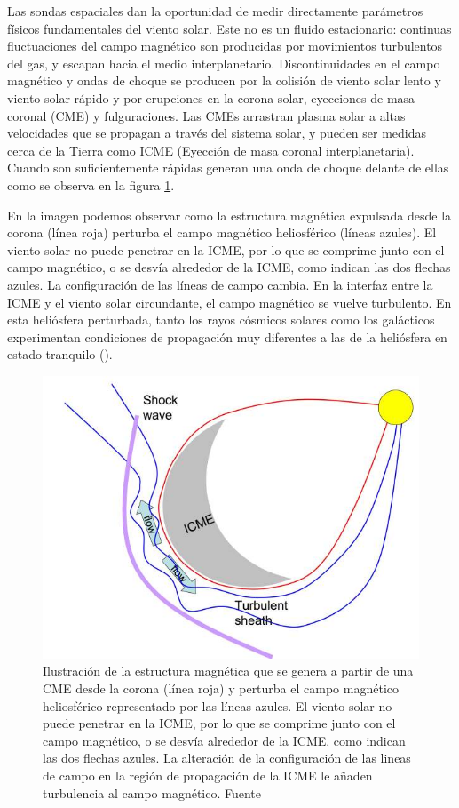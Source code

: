 Las sondas espaciales dan la oportunidad de medir directamente parámetros físicos fundamentales del viento solar. Este no es un fluido estacionario: continuas fluctuaciones del campo magnético son producidas por movimientos turbulentos del gas, y escapan hacia el medio interplanetario. Discontinuidades en el campo magnético y ondas de choque se producen por la colisión de viento solar lento y viento solar rápido y por erupciones en la corona solar, eyecciones de masa coronal (CME) y fulguraciones. Las CMEs arrastran plasma solar a altas velocidades que se propagan a través del sistema solar, y pueden ser medidas cerca de la Tierra como ICME (Eyección de masa coronal interplanetaria). Cuando son suficientemente rápidas generan una onda de choque delante de ellas como se observa en la figura \ref{icme}. 

En la imagen podemos observar como la estructura magnética expulsada desde la corona (línea roja) perturba el campo magnético heliosférico (líneas azules). El viento solar no puede penetrar en la ICME, por lo que se comprime junto con el campo magnético, o se desvía alrededor de la ICME, como indican las dos flechas azules. La configuración de las líneas de campo cambia. En la interfaz entre la ICME y el viento solar circundante, el campo magnético se vuelve turbulento. En esta heliósfera perturbada, tanto los rayos cósmicos solares como los galácticos experimentan condiciones de propagación muy diferentes a las de la heliósfera en estado tranquilo (\cite{NMDB}).
\begin{figure}[H]
    \centering
    \includegraphics[width=0.5\linewidth]{Figs/Dessin_ICME_sm_0.jpg}
    \caption{Ilustración de la estructura magnética que se genera a partir de una CME desde la corona (línea roja) y perturba el campo magnético heliosférico representado por las líneas azules. El viento solar no puede penetrar en la ICME, por lo que se comprime junto con el campo magnético, o se desvía alrededor de la ICME, como indican las dos flechas azules. La alteración de la configuración de las lineas de campo en la región de propagación de la ICME le añaden turbulencia al campo magnético. Fuente \cite{NMDB}}
    \label{icme}
\end{figure}
